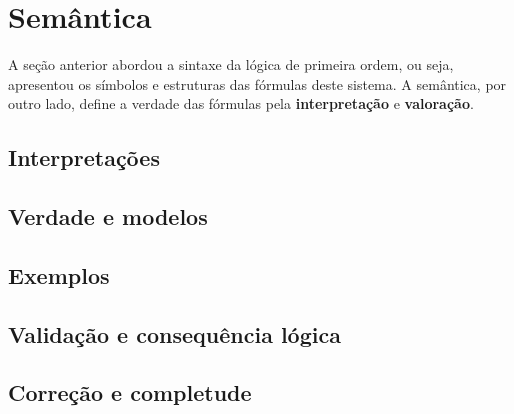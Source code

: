 \section{Semântica}
    
   A seção anterior abordou a sintaxe da lógica de primeira ordem, ou seja, apresentou os símbolos e estruturas das fórmulas deste sistema. A semântica, por outro lado, define a verdade das fórmulas pela \textbf{interpretação} e \textbf{valoração}.
    
    \subsection{Interpretações}
    
    \subsection{Verdade e modelos}
    
    \subsection{Exemplos}
    
    \subsection{Validação e consequência lógica}
    
    \subsection{Correção e completude}
    

